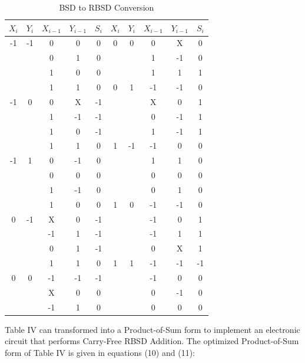\documentclass[conference]{IEEEtran_IBSS}
\begin{document}
\vspace{-.5em}
\begin{table}[h!]
  \centering
  \caption{BSD to RBSD Conversion}
  \label{tab:table4}
  \begin{tabular}{|c|c|c|c||c|||c|c|c|c||c|}
    \hline
    $X_{i}$ & $Y_{i}$ & $X_{i-1}$ & $Y_{i-1}$ & $S_{i}$ & $X_{i}$ & $Y_{i}$ & $X_{i-1}$ & $Y_{i-1}$ & $S_{i}$ \\
    \hline
    \hline
    -1 & -1 & 0 & 0 & 0  &  0 & 0 & 0 & X & 0 \\
    \hline
    & & 0 & 1 & 0  &  & & 1 & -1 & 0 \\
    \hline
    & & 1 & 0 & 0  &  & & 1 & 1 & 1 \\
    \hline
    & & 1 & 1 & 0  &  0 & 1 & -1 & -1 & 0 \\
    \hline
    -1 & 0 & 0 & X & -1  &  & & X & 0 & 1 \\
    \hline
    & & 1 & -1 & -1  &  & & 0 & -1 & 1 \\
    \hline
    & & 1 & 0 & -1  &  & & 1 & -1 & 1 \\
    \hline
    & & 1 & 1 & 0  &  1 & -1 & -1 & 0 & 0 \\
    \hline
    -1 & 1 & 0 & -1 & 0  &  & & 1 & 1 & 0 \\
    \hline
    & & 0 & 0 & 0  &  & & 0 & 0 & 0 \\
    \hline
    & & 1 & -1 & 0 &  & & 0 & 1 & 0 \\
    \hline
    & & 1 & 0 & 0  &  1 & 0 & -1 & -1 & 0 \\
    \hline
    0 & -1 & X & 0 & -1  &  & & -1 & 0 & 1 \\
    \hline
    & & -1 & 1 & -1  &  & & -1 & 1 & 1 \\
    \hline
    & & 0 & 1 & -1  &  & & 0 & X & 1 \\
    \hline
    & & 1 & 1 & 0  &  1 & 1 & -1 & -1 & -1 \\
    \hline
    0 & 0 & -1 & -1 & -1  &  & & -1 & 0 & 0 \\
    \hline
    & & X & 0 & 0  &  & & 0 & -1 & 0 \\
    \hline
    & & -1 & 1 & 0  &  & & 0 & 0 & 0 \\
    \hline
  \end{tabular}
\end{table}

Table IV can transformed into a Product-of-Sum form to implement an electronic circuit that performs Carry-Free RBSD Addition. The optimized Product-of-Sum form of Table IV is given in equations (10) and (11):
\end{document}
